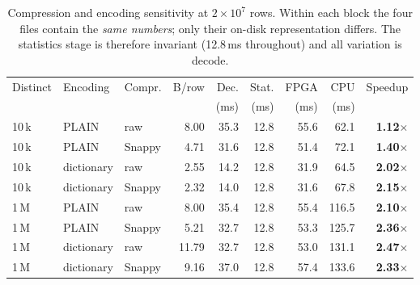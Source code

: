\begin{table}[t]
\centering\small
\caption{Compression and encoding sensitivity at $2\times10^7$ rows. Within each block the four
files contain the \emph{same numbers}; only their on-disk representation differs. The statistics
stage is therefore invariant (12.8\,ms throughout) and all variation is decode.}
\label{tab:codec}
\begin{tabular}{@{}lll r rr rr r@{}}
\toprule
Distinct & Encoding & Compr. & B/row & Dec. & Stat. & FPGA & CPU & Speedup \\
         &          &        &       & (ms) & (ms)  & (ms) & (ms) & \\
\midrule
10\,k & PLAIN & raw & 8.00 & 35.3 & 12.8 & 55.6 & 62.1 & \textbf{1.12$\times$} \\
10\,k & PLAIN & Snappy & 4.71 & 31.6 & 12.8 & 51.4 & 72.1 & \textbf{1.40$\times$} \\
10\,k & dictionary & raw & 2.55 & 14.2 & 12.8 & 31.9 & 64.5 & \textbf{2.02$\times$} \\
10\,k & dictionary & Snappy & 2.32 & 14.0 & 12.8 & 31.6 & 67.8 & \textbf{2.15$\times$} \\
\midrule
1\,M & PLAIN & raw & 8.00 & 35.4 & 12.8 & 55.4 & 116.5 & \textbf{2.10$\times$} \\
1\,M & PLAIN & Snappy & 5.21 & 32.7 & 12.8 & 53.3 & 125.7 & \textbf{2.36$\times$} \\
1\,M & dictionary & raw & 11.79 & 32.7 & 12.8 & 53.0 & 131.1 & \textbf{2.47$\times$} \\
1\,M & dictionary & Snappy & 9.16 & 37.0 & 12.8 & 57.4 & 133.6 & \textbf{2.33$\times$} \\
\bottomrule
\end{tabular}
\end{table}

